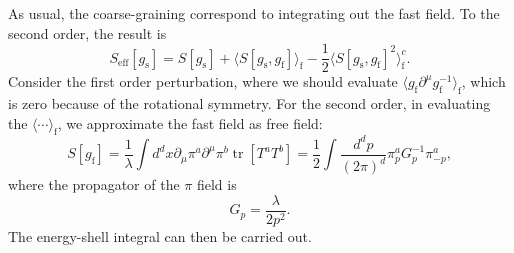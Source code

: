 \documentclass[aps,prb,superscriptaddress,nofootinbib]{revtex4}
\def \tr{\operatorname{tr}}
\begin{document}
As usual, the coarse-graining correspond to integrating out the fast field.
To the second order, the result is
\begin{equation}
	S_{\mathrm{eff}}[g_{\mathrm{s}}] 
	= S[g_{\mathrm{s}}] + \langle S[g_{\mathrm{s}},g_{\mathrm{f}}]\rangle_{\mathrm{f}}-\frac{1}{2}\langle S[g_{\mathrm{s}},g_{\mathrm{f}}]^2\rangle^c_{\mathrm{f}}.
\end{equation}
Consider the first order perturbation, where we should evaluate $\langle g_{\mathrm{f}} \partial^\mu g_{\mathrm{f}}^{-1}\rangle_{\mathrm{f}}$, which is zero because of the rotational symmetry.
For the second order, in evaluating the $\langle\cdots\rangle_\mathrm{f}$, we approximate the fast field as free field:
\begin{equation}
	S[g_{\mathrm{f}}] = \frac{1}{\lambda} \int d^d x \partial_\mu \pi^a \partial^\mu \pi^b \tr[T^a T^b]
	= \frac{1}{2}\int \frac{d^d p}{(2\pi)^d} \pi^a_pG^{-1}_p\pi^a_{-p},
\end{equation}
where the propagator of the $\pi$ field is
\begin{equation}
	G_p = \frac{\lambda}{2 p^2}.
\end{equation}
The energy-shell integral can then be carried out.
\end{document}
